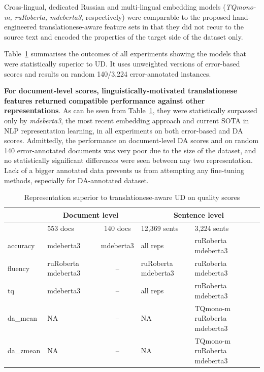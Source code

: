 Cross-lingual, dedicated Russian and multi-lingual embedding models (\textit{TQmono-m, ruRoberta, mdeberta3}, respectively) were comparable to the proposed hand-engineered translationese-aware feature sets in that they did not recur to the source text and encoded the properties of the target side of the dataset only.

Table~\ref{tab:_ud_vs_all} summarises the outcomes of all experiments showing the models that were statistically superior to UD. It uses unweighted versions of error-based scores and results on random 140/3,224 error-annotated instances.

\textbf{For document-level scores, linguistically-motivated translationese features returned compatible performance against other representations}. As can be seen from Table~\ref{tab:_ud_vs_all}, they were statistically surpassed only by \textit{mdeberta3}, the most recent embedding approach and current SOTA in NLP representation learning, in all experiments on both error-based and DA scores. Admittedly, the performance on document-level DA scores and on random 140 error-annotated documents was very poor due to the size of the dataset, and no statistically significant differences were seen between any two representation. 
Lack of a bigger annotated data prevents us from attempting any fine-tuning methods, especially for DA-annotated dataset.

\begin{table}[H]
	\centering
	\begin{tabular}{l|p{2cm}c||p{3cm}p{3cm}}
		\toprule
		& \multicolumn{2}{c||}{Document level} & \multicolumn{2}{c}{Sentence level} \\
		\midrule
		& 553 docs & 140 docs   & 12,369 sents & 3,224 sents  \\
		\midrule
		accuracy   & mdeberta3 & mdeberta3 & all reps & ruRoberta mdeberta3 \\
		fluency    & ruRoberta mdeberta3 & -- & ruRoberta mdeberta3 & ruRoberta mdeberta3 \\
		tq         & mdeberta3 & -- & all reps & ruRoberta mdeberta3 \\
		\midrule
		da\_mean   & NA & -- & NA & TQmono-m ruRoberta mdeberta3 \\
		da\_zmean  & NA & -- & NA & TQmono-m ruRoberta mdeberta3 \\
		\bottomrule
	\end{tabular}
	\caption{\label{tab:_ud_vs_all}Representation superior to translationese-aware UD on quality scores}
\end{table}

